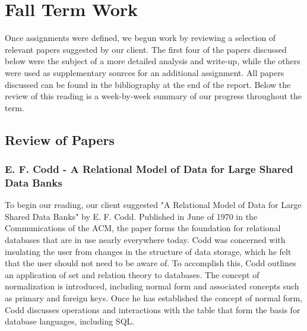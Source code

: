 \documentclass[onecolumn, draftclsnofoot,10pt, compsoc]{IEEEtran}
\begin{document}
\section{Fall Term Work}

Once assignments were defined, we begun work by reviewing a selection of relevant papers suggested by our client. 
The first four of the papers discussed below were the subject of a more detailed analysis and write-up, while the others were used as supplementary sources for an additional assignment. 
All papers discussed can be found in the bibliography at the end of the report.
Below the review of this reading is a week-by-week summary of our progress throughout the term.

\subsection{Review of Papers}

\subsubsection{E. F. Codd - A Relational Model of Data for Large Shared Data Banks}

To begin our reading, our client suggested "A Relational Model of Data for Large Shared Data Banks" by E. F. Codd.
Published in June of 1970 in the Communications of the ACM, the paper forms the foundation for relational databases that are in use nearly everywhere today.
Codd was concerned with insulating the user from changes in the structure of data storage, which he felt that the user should not need to be aware of.
To accomplish this, Codd outlines an application of set and relation theory to databases. 
The concept of normalization is introduced, including normal form and associated concepts such as primary and foreign keys.
Once he has established the concept of normal form, Codd discusses operations and interactions with the table that form the basis for database languages, including SQL. 
\end{document}

